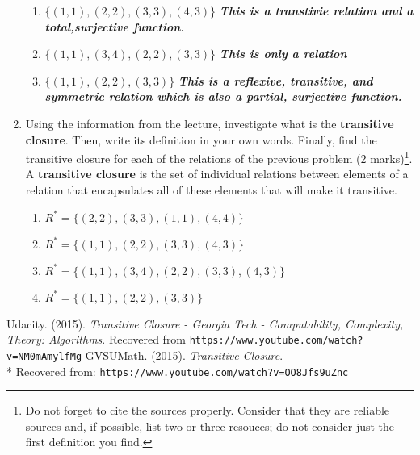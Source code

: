 \documentclass[]{book}
\theoremstyle{definition}
\begin{document}
\begin{enumerate}
\begin{enumerate}
            \item $\{(1,1),(2,2),(3,3),(4,3)\}$ \emph{\textbf{This is a transtivie relation and a total,surjective function.}}
            \item $\{(1,1),(3,4),(2,2),(3,3)\}$ \emph{\textbf{This is only a relation}}
            \item $\{(1,1),(2,2),(3,3)\}$ \emph{\textbf{This is a reflexive, transitive, and symmetric relation which is also a partial, surjective function.}}
        \end{enumerate}
        \item Using the information from the lecture, investigate what is the \textbf{transitive closure}. Then, write its definition in your own words. Finally, find the transitive closure for each of the relations of the previous problem (2 marks)\footnote{Do not forget to cite the sources properly. Consider that they are reliable sources and, if possible, list two or three resouces; do not consider just the first definition you find.}.
        \newline A \textbf{transitive closure} is the set of individual relations between elements of a relation that encapsulates all of these elements that will make it transitive. 
        \begin{enumerate}
            \item $R^* = \{(2,2),(3,3),(1,1),(4,4)\}$
            \item $R^* = \{(1,1),(2,2),(3,3),(4,3)\}$
            \item $R^* = \{(1,1),(3,4),(2,2),(3,3),(4,3)\}$
            \item $R^* = \{(1,1),(2,2),(3,3)\}$
        \end{enumerate}
    \end{enumerate}
    \begin{thebibliography}{9}
    Udacity. (2015). \textit{Transitive Closure - Georgia Tech - Computability, Complexity, Theory: Algorithms}. Recovered from \texttt{https://www.youtube.com/watch?v=NM0mAmylfMg}
    GVSUMath. (2015). \textit{Transitive Closure}.\\* Recovered from: \texttt{https://www.youtube.com/watch?v=OO8Jfs9uZnc}
    \end{thebibliography}
\end{document}
